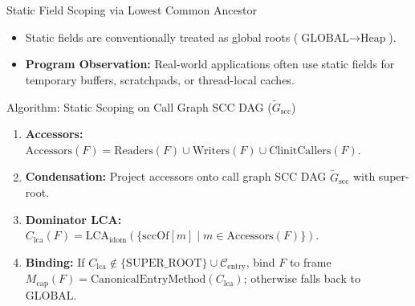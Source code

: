 \documentclass[11pt]{beamer}
\begin{document}
\begin{frame}{Static Field Scoping via Lowest Common Ancestor}
  \begin{itemize}
    \item Static fields are conventionally treated as global roots ($\text{GLOBAL} \to \text{Heap}$).
    \item \textbf{Program Observation:} Real-world applications often use static fields for temporary buffers, scratchpads, or thread-local caches.
  \end{itemize}

  \begin{block}{Algorithm: Static Scoping on Call Graph SCC DAG ($\widetilde{G}_{\text{scc}}$)}
    \small
    \begin{enumerate}
      \item \textbf{Accessors:} $\text{Accessors}(F) = \text{Readers}(F) \cup \text{Writers}(F) \cup \text{ClinitCallers}(F)$.
      \item \textbf{Condensation:} Project accessors onto call graph SCC DAG $\widetilde{G}_{\text{scc}}$ with super-root.
      \item \textbf{Dominator LCA:} $C_{\text{lca}}(F) = \mathrm{LCA}_{\text{idom}}(\{ \text{sccOf}[m] \mid m \in \text{Accessors}(F) \})$.
      \item \textbf{Binding:} If $C_{\text{lca}} \notin \{\text{SUPER\_ROOT}\} \cup \mathcal{C}_{\text{entry}}$, bind $F$ to frame $M_{\text{cap}}(F) = \text{CanonicalEntryMethod}(C_{\text{lca}})$; otherwise falls back to $\text{GLOBAL}$.
    \end{enumerate}
  \end{block}
\end{frame}
\end{document}
